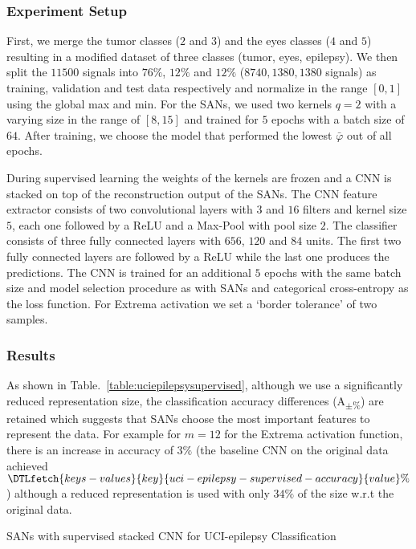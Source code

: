 \documentclass[journal]{IEEEtran}
\begin{document}
\subsubsection{Experiment Setup}
First, we merge the tumor classes ($2$ and $3$) and the eyes classes ($4$ and $5$) resulting in a modified dataset of three classes (tumor, eyes, epilepsy).
We then split the $11500$ signals into $76\%$, $12\%$ and $12\%$ ($8740,1380,1380$ signals) as training, validation and test data respectively and normalize in the range $[0, 1]$ using the global max and min.
For the SANs, we used two kernels $q=2$ with a varying size in the range of $[8, 15]$ and trained for $5$ epochs with a batch size of $64$.
After training, we choose the model that performed the lowest $\bar\varphi$ out of all epochs.

During supervised learning the weights of the kernels are frozen and a CNN is stacked on top of the reconstruction output of the SANs.
The CNN feature extractor consists of two convolutional layers with $3$ and $16$ filters and kernel size $5$, each one followed by a ReLU and a Max-Pool with pool size $2$.
The classifier consists of three fully connected layers with $656$, $120$ and $84$ units.
The first two fully connected layers are followed by a ReLU while the last one produces the predictions.
The CNN is trained for an additional $5$ epochs with the same batch size and model selection procedure as with SANs and categorical cross-entropy as the loss function.
For Extrema activation we set a `border tolerance' of two samples.

\subsubsection{Results}
As shown in Table.~\ref{table:uciepilepsysupervised}, although we use a significantly reduced representation size, the classification accuracy differences (A\textsubscript{$\pm$\%}) are retained which suggests that SANs choose the most important features to represent the data.
For example for $m=12$ for the Extrema activation function, there is an increase in accuracy of $3\%$ (the baseline CNN on the original data achieved $\DTLfetch{keys-values}{key}{uci-epilepsy-supervised-accuracy}{value}\%$) although a reduced representation is used with only $34\%$ of the size w.r.t the original data.

\begin{table*}[!t]
	\centering
	\caption{SANs with supervised stacked CNN for UCI-epilepsy Classification}\label{table:uciepilepsysupervised}
	\begin{adjustbox}{width=\textwidth}
		
	\end{adjustbox}
\end{table*}
\end{document}
